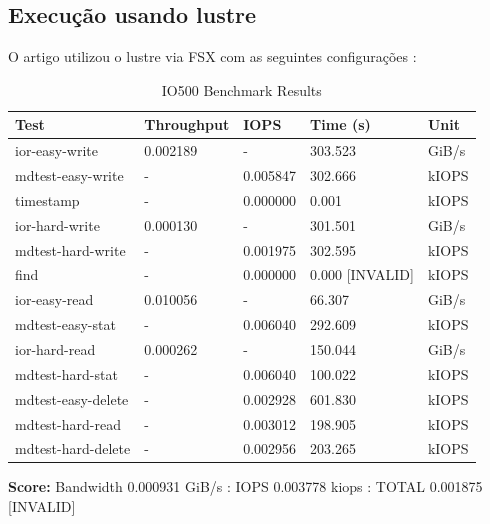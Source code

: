 \documentclass[article,a4paper,12pt,brazil,sumario=tradicional]{abntex2}
\begin{document}
\subsection{Execução usando lustre}
O artigo utilizou o lustre via FSX com as seguintes configurações : 
\begin{table}[htb]
	\centering
	\begin{tabular}{|l|l|l|l|l|}
		\hline
		\rowcolor[HTML]{EFEFEF}
		\textbf{Test}          & \textbf{Throughput}        & \textbf{IOPS}         & \textbf{Time (s)} & \textbf{Unit} \\ \hline
		ior-easy-write         & 0.002189                    & -                    & 303.523           & GiB/s         \\ \hline
		mdtest-easy-write      & -                          & 0.005847             & 302.666           & kIOPS         \\ \hline
		timestamp              & -                          & 0.000000             & 0.001             & kIOPS         \\ \hline
		ior-hard-write         & 0.000130                    & -                    & 301.501           & GiB/s         \\ \hline
		mdtest-hard-write      & -                          & 0.001975             & 302.595           & kIOPS         \\ \hline
		find                   & -                          & 0.000000             & 0.000 [INVALID]   & kIOPS         \\ \hline
		ior-easy-read          & 0.010056                    & -                    & 66.307            & GiB/s         \\ \hline
		mdtest-easy-stat       & -                          & 0.006040             & 292.609           & kIOPS         \\ \hline
		ior-hard-read          & 0.000262                    & -                    & 150.044           & GiB/s         \\ \hline
		mdtest-hard-stat       & -                          & 0.006040             & 100.022           & kIOPS         \\ \hline
		mdtest-easy-delete     & -                          & 0.002928             & 601.830           & kIOPS         \\ \hline
		mdtest-hard-read       & -                          & 0.003012             & 198.905           & kIOPS         \\ \hline
		mdtest-hard-delete     & -                          & 0.002956             & 203.265           & kIOPS         \\ \hline
	\end{tabular}
	\caption{IO500 Benchmark Results}
	\label{tab:io500-results}
	\textbf{Score:} Bandwidth 0.000931 GiB/s : IOPS 0.003778 kiops : TOTAL 0.001875 [INVALID]
\end{table}
\end{document}
